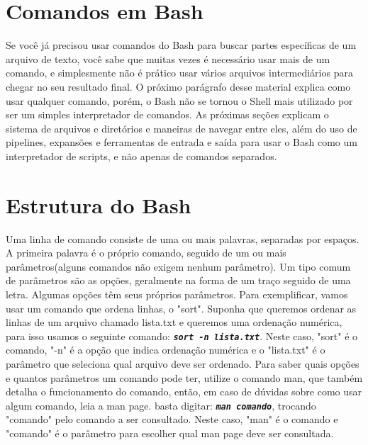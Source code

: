 \documentclass[oneside, 11 pt]{article}
\begin{document}
	\section{Comandos em Bash}
	Se você já precisou usar comandos do Bash para buscar partes específicas de um arquivo de texto, você sabe que muitas vezes é necessário usar mais de um comando, e simplesmente não é prático usar vários arquivos intermediários para chegar no seu resultado final. O próximo parágrafo desse material explica como usar qualquer comando, porém, o Bash não se tornou o Shell mais utilizado por ser um simples interpretador de comandos. As próximas seções explicam o sistema de arquivos e diretórios e maneiras de navegar entre eles, além do uso de pipelines, expansões e ferramentas de entrada e saída para usar o Bash como um interpretador de scripts, e não apenas de comandos separados.
	
	\section{Estrutura do Bash}
	Uma linha de comando consiste de uma ou mais palavras, separadas por espaços. A primeira palavra é o próprio comando, seguido de um ou mais parâmetros(alguns comandos não exigem nenhum parâmetro). Um tipo comum de parâmetros são as opções, geralmente na forma de um traço seguido de uma letra. Algumas opções têm seus próprios parâmetros. Para exemplificar, vamos usar um comando que ordena linhas, o "sort". Suponha que queremos ordenar as linhas de um arquivo chamado lista.txt e queremos uma ordenação numérica, para isso usamos o seguinte comando: \texttt{\textbf{\textit{sort -n lista.txt}}}.
	Neste caso, "sort" é o comando, "-n" é a opção que indica ordenação numérica e o "lista.txt" é o parâmetro que seleciona qual arquivo deve ser ordenado.
	Para saber quais opções e quantos parâmetros um comando pode ter, utilize o comando man, que também detalha o funcionamento do comando, então, em caso de dúvidas sobre como usar algum comando, leia a man page. basta digitar: \texttt{\textbf{\textit{man comando}}}, trocando "comando" pelo comando a ser consultado.
	Neste caso, "man" é o comando e "comando" é o parâmetro para escolher qual man page deve ser consultada.
	
\end{document}

